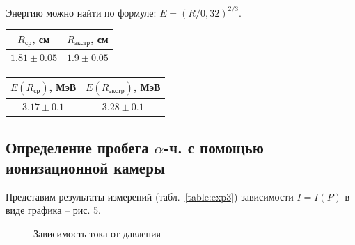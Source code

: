 \documentclass[a4paper,12pt]{article} %
\begin{document}
		Энергию можно найти по формуле: $E = \left(R/0,32\right)^{2/3}$.
	
			\begin{table}[h!]
			\begin{floatrow}
				{\begin{tabular}{|c|c|}
						\hline
						$R_\text{ср}$, см & $R_\text{экстр}$, см \\ \hline
						$1.81 \pm 0.05 $   & $1.9 \pm 0.05$       \\ \hline
				\end{tabular}}
				{\begin{tabular}{|c|c|}
						\hline
						$E(R_\text{ср})$, МэВ & $E(R_\text{экстр})$, МэВ \\ \hline
						$3.17 \pm 0.1 $     & $3.28 \pm 0.1 $        \\ \hline
				\end{tabular}}        
			\end{floatrow}
		\end{table}
	
		\subsection{Определение пробега $\alpha$-ч. с помощью ионизационной камеры}
			Представим результаты измерений (табл.~\ref{table:exp3}) зависимости $I=I(P)$ в виде графика -- рис. 5. 
		
		\begin{figure}[h!]
			\begin{floatrow}
				
				\caption{Зависимость тока от давления}
			\end{floatrow}
		\end{figure}
		
		
		
\end{document}
